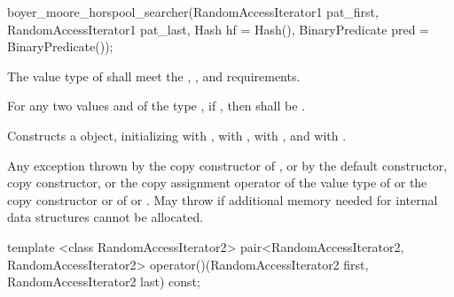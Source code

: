 %
\begin{itemdecl}
boyer_moore_horspool_searcher(RandomAccessIterator1 pat_first,
                              RandomAccessIterator1 pat_last,
                              Hash hf = Hash(),
                              BinaryPredicate pred = BinaryPredicate());
\end{itemdecl}

\begin{itemdescr}
\pnum
\requires
The value type of  shall meet the ,
, and  requirements.

\pnum
\requires
For any two values  and  of the type ,
if , then  shall be .

\pnum
\effects
Constructs a  object, initializing  with ,
 with ,  with , and  with .

\pnum
\throws
Any exception thrown by the copy constructor of ,
or by the default constructor, copy constructor, or the copy assignment operator of the value type of 
or the copy constructor or  of  or .
May throw  if additional memory needed for internal data structures cannot be allocated.
\end{itemdescr}

%
\begin{itemdecl}
template <class RandomAccessIterator2>
  pair<RandomAccessIterator2, RandomAccessIterator2>
    operator()(RandomAccessIterator2 first, RandomAccessIterator2 last) const;
\end{itemdecl}


